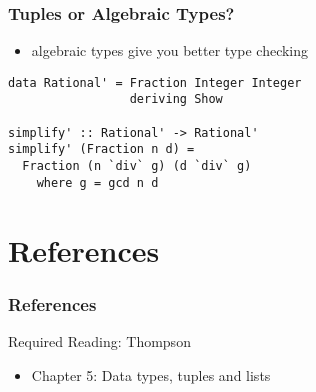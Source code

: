 \documentclass[dvipsnames]{beamer}
\theoremstyle{plain}
\begin{document}
\begin{frame}[fragile]
  \frametitle{Tuples or Algebraic Types?}

  \begin{itemize}
    \item algebraic types give you better type checking
  \end{itemize}

  \begin{lstlisting}
data Rational' = Fraction Integer Integer
                 deriving Show

simplify' :: Rational' -> Rational'
simplify' (Fraction n d) =
  Fraction (n `div` g) (d `div` g)
    where g = gcd n d
  \end{lstlisting}
\end{frame}


\section*{References}

\begin{frame}
  \frametitle{References}

  \begin{block}{Required Reading: Thompson}
    \begin{itemize}
      \item Chapter 5: \alert{Data types, tuples and lists}
    \end{itemize}
  \end{block}
\end{frame}
\end{document}
